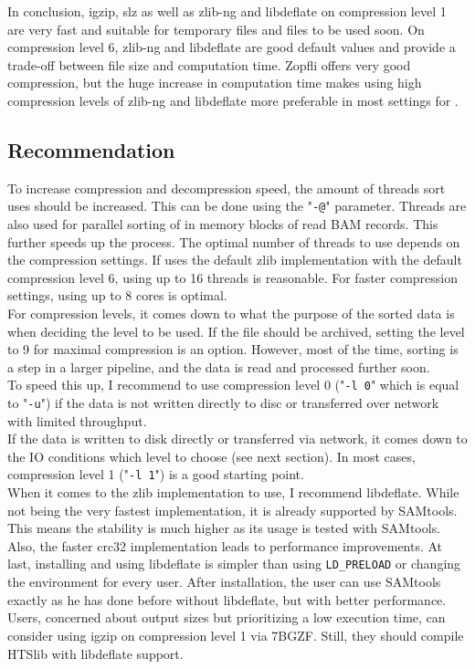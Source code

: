 In conclusion, igzip, slz as well as zlib-ng and libdeflate on compression level 1 are very fast and suitable for temporary files and files to be used soon. On compression level 6, zlib-ng and libdeflate are good default values and provide a trade-off between file size and computation time. Zopfli offers very good compression, but the huge increase in computation time makes using high compression levels of zlib-ng and libdeflate more preferable in most settings for \sort.

\subsection{Recommendation}
To increase compression and decompression speed, the amount of threads \sort sort uses should be increased. This can be done using the "\texttt{-@}" parameter. Threads are also used for parallel sorting of in memory blocks of read BAM records. This further speeds up the process. The optimal number of threads to use depends on the compression settings. If \sort uses the default zlib implementation with the default compression level 6, using up to 16 threads is reasonable. For faster compression settings, using up to 8 cores is optimal. \\
For compression levels, it comes down to what the purpose of the sorted data is when deciding the level to be used. 
If the file should be archived, setting the level to 9 for maximal compression is an option. However, most of the time, sorting is a step in a larger pipeline, and the data is read and processed further soon. \\
To speed this up, I recommend to use compression level 0 ("\texttt{-l 0}" which is equal to "\texttt{-u}") if the data is not written directly to  disc or transferred over network with limited throughput. \\
If the data is written to disk directly or transferred via network, it comes down to the IO conditions which level to choose (see next section). In most cases, compression level 1 ("\texttt{-l 1}") is a good starting point.\\
When it comes to the zlib implementation to use, I recommend libdeflate. While not being the very fastest implementation, it is already supported by SAMtools. This means the stability is much higher as its usage is tested with SAMtools. Also, the faster crc32 implementation leads to performance improvements. At last, installing and using libdeflate is simpler than using \texttt{LD\_PRELOAD} or changing the environment for every user. After installation, the user can use SAMtools exactly as he has done before without libdeflate, but with better performance. \\
Users, concerned about output sizes but prioritizing a low execution time, can consider using igzip on compression level 1 via 7BGZF. Still, they should compile HTSlib with libdeflate support. 

